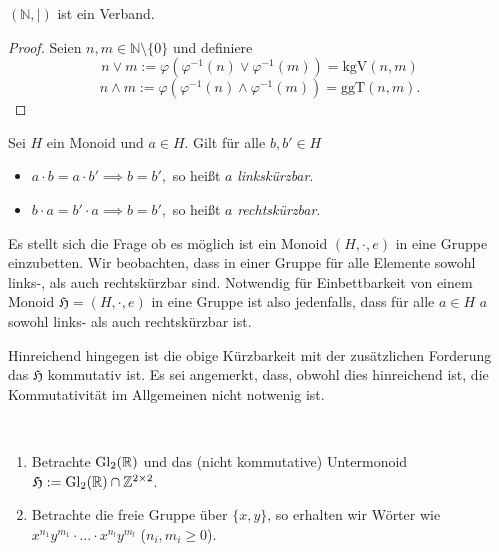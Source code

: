\begin{corollary}
    $(\mathbb{N}, \mid)$ ist ein Verband.
\end{corollary}

\begin{proof}
    Seien $n,m \in \mathbb{N} \setminus \{0\}$ und definiere
    $$ n \vee m := \varphi(\varphi^{-1}(n) \vee \varphi^{-1}(m)) = \textrm{kgV}(n,m) $$
    $$ n \wedge m := \varphi(\varphi^{-1}(n) \wedge \varphi^{-1}(m)) = \textrm{ggT}(n,m). $$
\end{proof}

\begin{definition}
    Sei $H$ ein Monoid und $a \in H$. Gilt für alle $b, b' \in H$
    \begin{itemize}
        \item $ a \cdot b = a \cdot b' \implies b = b', $ so heißt $a$ \emph{linkskürzbar}.
        \item $ b \cdot a = b' \cdot a \implies b = b', $ so heißt $a$ \emph{rechtskürzbar}.
    \end{itemize}
\end{definition}

\begin{remark}
    Es stellt sich die Frage ob es möglich ist ein Monoid $(H, \cdot, e)$ in eine Gruppe einzubetten. Wir beobachten, dass in einer Gruppe für alle Elemente sowohl links-, als auch rechtskürzbar sind. Notwendig für Einbettbarkeit von einem Monoid $\mathfrak{H} = (H, \cdot, e)$ in eine Gruppe ist also jedenfalls, dass für alle $a \in H$ $a$ sowohl links- als auch rechtskürzbar ist.

    Hinreichend hingegen ist die obige Kürzbarkeit mit der zusätzlichen Forderung das $\mathfrak{H}$ kommutativ ist. Es sei angemerkt, dass, obwohl dies hinreichend ist, die Kommutativität im Allgemeinen nicht notwenig ist.
\end{remark}

\begin{example} {\ }
    \begin{enumerate}
        \item Betrachte $\operatorname{Gl}_2(\mathbb{R})$ und das (nicht kommutative) Untermonoid $\mathfrak{H} := \operatorname{Gl}_2(\mathbb{R}) \cap \mathbb{Z}^{2 \times 2}$.
        \item Betrachte die freie Gruppe über $\{x,y\}$, so erhalten wir Wörter wie $x^{n_1} y^{m_1} \cdot ... \cdot x^{n_l} y^{m_l}$ ($n_i, m_i \geq 0$).
    \end{enumerate}
\end{example}

